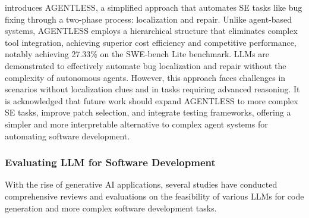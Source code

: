 \citet{xia2024agentless} introduces AGENTLESS, a simplified approach that automates SE tasks like bug fixing through a two-phase process: localization and repair. Unlike agent-based systems, AGENTLESS employs a hierarchical structure that eliminates complex tool integration, achieving superior cost efficiency and competitive performance, notably achieving 27.33\% on the SWE-bench Lite benchmark. LLMs are demonstrated to effectively automate bug localization and repair without the complexity of autonomous agents. However, this approach faces challenges in scenarios without localization clues and in tasks requiring advanced reasoning. It is acknowledged that future work should expand AGENTLESS to more complex SE tasks, improve patch selection, and integrate testing frameworks, offering a simpler and more interpretable alternative to complex agent systems for automating software development.

\subsubsection{Evaluating LLM for Software Development}
With the rise of generative AI applications, several studies have conducted comprehensive reviews and evaluations on the feasibility of various LLMs for code generation and more complex software development tasks.
  
